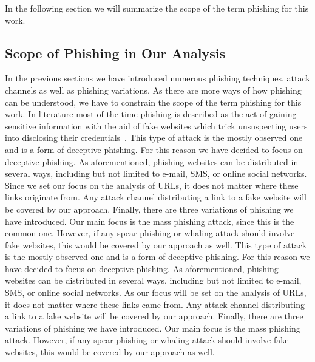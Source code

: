  In the following section we will summarize the scope of the term phishing for this work.
\subsection{Scope of Phishing in Our Analysis}
\label{s:scope}
In the previous sections we have introduced numerous phishing techniques, attack channels as well as phishing variations. As there are more ways of how phishing can be understood, we have to constrain the scope of the term phishing for this work. In literature most of the time phishing is described as the act of gaining sensitive information with the aid of fake websites which trick unsuspecting users into disclosing their credentials~\cite{sheng2007antiphishingphil, antiphishingtrendreport2013, kasperskyreport2013}.
This type of attack is the mostly observed one and is a form of deceptive phishing. For this reason we have decided to focus on deceptive phishing. As aforementioned, phishing websites can be distributed in several ways, including but not limited to e-mail, SMS, or online social networks. Since we set our focus on the analysis of URLs, it does not matter where these links originate from. Any attack channel distributing a link to a fake website will be covered by our approach. Finally, there are three variations of phishing we have introduced. Our main focus is the mass phishing attack, since this is the common one. However, if any spear phishing or whaling attack should involve fake websites, this would be covered by our approach as well.
This type of attack is the mostly observed one and is a form of deceptive phishing. For this reason we have decided to focus on deceptive phishing. As aforementioned, phishing websites can be distributed in several ways, including but not limited to e-mail, SMS, or online social networks. As our focus will be set on the analysis of URLs, it does not matter where these links came from. Any attack channel distributing a link to a fake website will be covered by our approach. Finally, there are three variations of phishing we have introduced. Our main focus is the mass phishing attack. However, if any spear phishing or whaling attack should involve fake websites, this would be covered by our approach as well.

